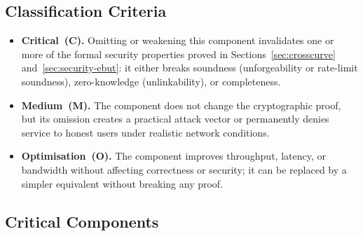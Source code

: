 \documentclass[11pt]{article}
\theoremstyle{definitionstyle}
\theoremstyle{plain}
\begin{document}
\subsection{Classification Criteria}

\begin{itemize}[leftmargin=*]
\item \textbf{Critical~(C).} Omitting or weakening this component invalidates
  one or more of the formal security properties proved in
  Sections~\ref{sec:crosscurve} and~\ref{sec:security-ebut}: it either
  breaks soundness (unforgeability or rate-limit soundness), zero-knowledge
  (unlinkability), or completeness.
\item \textbf{Medium~(M).} The component does not change the cryptographic
  proof, but its omission creates a practical attack vector or permanently
  denies service to honest users under realistic network conditions.
\item \textbf{Optimisation~(O).} The component improves throughput, latency,
  or bandwidth without affecting correctness or security; it can be replaced
  by a simpler equivalent without breaking any proof.
\end{itemize}

\subsection{Critical Components}
\label{sec:critical}
\end{document}
